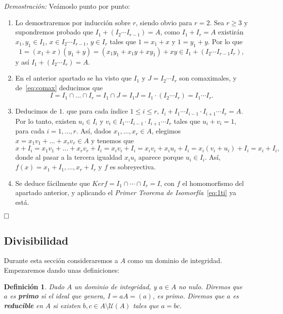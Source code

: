 \documentclass[12pt]{article}
\newtheorem{definition}[theorem]{Definición}
\begin{document}
\emph{Demostración: } Veámoslo punto por punto: \begin{enumerate}
\item Lo demostraremos por inducción sobre $r$, siendo obvio para $r = 2$. Sea $r \geq 3$ y supondremos probado que $I_{1} + (I_{2} \cdots I_{r-1}) = A$, como $I_{1} + I_{r} = A$ existirán $x_{1},y_{1} \in I_{1}$, $x \in I_{2} \cdots I_{r-1}$, $y \in I_{r}$ tales que $1 = x_{1} + x$ y $1 = y_{1} + y$. Por lo que $$1 = (x_{1} +x)(y_{1} + y)=(x_{1}y_{1} + x_{1}y + xy_{1}) + xy \in I_{1} + (I_{2} \cdots I_{r-1}I_{r}),$$ y así $I_{1} + (I_{2} \cdots I_{r}) = A.$
\item En el anterior apartado se ha visto que $I_{1}$ y $J= I_{2} \cdots I_{r}$ son comaximales, y de~\ref{eq:comax} deducimos que $$I = I_{1} \cap \ldots \cap I_{r} = I_{1} \cap J = I_{1}J = I_{1} \cdot (I_{2} \cdots I_{r}) = I_{1} \cdots I_{r}.$$
\item Deducimos de $1.$ que para cada índice $1 \leq i \leq r$, $I_{i} +I_{1}\cdots I_{i-1}\cdot I_{i+1} \cdots I_{r} = A.$ Por lo tanto, existen $u_{i} \in I_{i}$ y $v_{i} \in I_{1}\cdots I_{i-1}\cdot I_{i+1} \cdots I_{r}$ tales que $u_{i} + v_{i} = 1$, para cada $i = 1, \ldots, r$. Así, dados $x_{1}, \ldots, x_{r} \in A$, elegimos $x = x_{1}v_{1} + \ldots + x_{r}v_{r} \in A$ y tenemos que $$x + I_{i} = x_{1}v_{1} + \ldots + x_{r}v_{r} + I_{i} = x_{i}v_{i} + I_{i} =  x_{i}v_{i} +x_{i}u_{i} + I_{i} = x_{i}(v_{i} + u_{i}) + I_{i} = x_{i} + I_{i},$$ donde al pasar a la tercera igualdad $x_{i}u_{i}$ aparece porque $u_{i} \in I_{i}$. Así, $f(x) = x_{1} + I_{1}, \ldots, x_{r} + I_{r}$ y $f$ es sobreyectiva. 
\item Se deduce fácilmente que $Ker f = I_{1} \cap \cdots \cap I_{r} = I$, con $f$ el homomorfismo del apartado anterior, y aplicando el \textit{Primer Teorema de Isomorfía}~\ref{eq:1ti} ya está.
\end{enumerate}
$\hfill \square$


\subsection{Divisibilidad}

Durante esta sección consideraremos a $A$ como un dominio de integridad. Empezaremos dando unas definiciones:

\begin{definition} Dado $A$ un dominio de integridad, y $a \in A$ no nulo. Diremos que $a$ es \textbf{primo} si el ideal que genera, $I=aA = (a)$, es primo. Diremos que $a$ es \textbf{reducible} en $A$ si existen $b,c \in A \setminus \mathcal{U}(A)$ tales que $a =bc$.
\end{definition}
\end{document}
